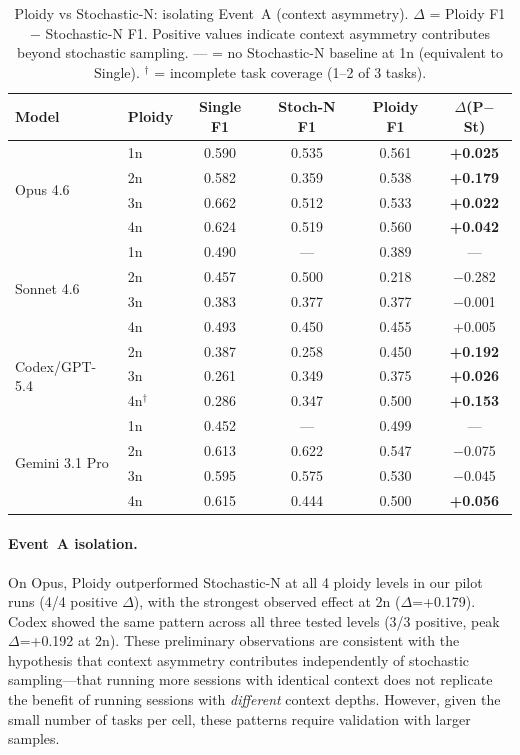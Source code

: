\documentclass[11pt]{article}
\begin{document}
\begin{table}[H]
\centering
\caption{Ploidy vs Stochastic-N: isolating Event~A (context asymmetry). $\Delta$ = Ploidy F1 $-$ Stochastic-N F1. Positive values indicate context asymmetry contributes beyond stochastic sampling. --- = no Stochastic-N baseline at 1n (equivalent to Single). $^\dagger$ = incomplete task coverage (1--2 of 3 tasks).}
\label{tab:ploidy-sweep}
\small
\begin{tabular}{@{}llcccc@{}}
\toprule
\textbf{Model} & \textbf{Ploidy} & \textbf{Single F1} & \textbf{Stoch-N F1} & \textbf{Ploidy F1} & \textbf{$\Delta$(P$-$St)} \\
\midrule
\multirow{4}{*}{Opus 4.6}
  & 1n & 0.590 & 0.535 & 0.561 & \textbf{+0.025} \\
  & 2n & 0.582 & 0.359 & 0.538 & \textbf{+0.179} \\
  & 3n & 0.662 & 0.512 & 0.533 & \textbf{+0.022} \\
  & 4n & 0.624 & 0.519 & 0.560 & \textbf{+0.042} \\
\midrule
\multirow{4}{*}{Sonnet 4.6}
  & 1n & 0.490 & --- & 0.389 & --- \\
  & 2n & 0.457 & 0.500 & 0.218 & $-$0.282 \\
  & 3n & 0.383 & 0.377 & 0.377 & $-$0.001 \\
  & 4n & 0.493 & 0.450 & 0.455 & +0.005 \\
\midrule
\multirow{3}{*}{Codex/GPT-5.4}
  & 2n & 0.387 & 0.258 & 0.450 & \textbf{+0.192} \\
  & 3n & 0.261 & 0.349 & 0.375 & \textbf{+0.026} \\
  & 4n$^\dagger$ & 0.286 & 0.347 & 0.500 & \textbf{+0.153} \\
\midrule
\multirow{4}{*}{Gemini 3.1 Pro}
  & 1n & 0.452 & --- & 0.499 & --- \\
  & 2n & 0.613 & 0.622 & 0.547 & $-$0.075 \\
  & 3n & 0.595 & 0.575 & 0.530 & $-$0.045 \\
  & 4n & 0.615 & 0.444 & 0.500 & \textbf{+0.056} \\
\bottomrule
\end{tabular}
\end{table}

\paragraph{Event~A isolation.} On Opus, Ploidy outperformed Stochastic-N at all 4 ploidy levels in our pilot runs (4/4 positive $\Delta$), with the strongest observed effect at 2n ($\Delta$=+0.179). Codex showed the same pattern across all three tested levels (3/3 positive, peak $\Delta$=+0.192 at 2n). These preliminary observations are consistent with the hypothesis that context asymmetry contributes independently of stochastic sampling---that running more sessions with identical context does not replicate the benefit of running sessions with \emph{different} context depths. However, given the small number of tasks per cell, these patterns require validation with larger samples.
\end{document}
